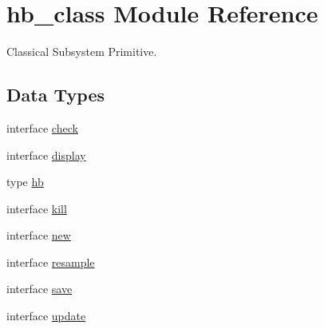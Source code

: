 \hypertarget{classhb__class}{\section{hb\+\_\+class Module Reference}
\label{classhb__class}
}


Classical Subsystem Primitive.  


\subsection*{Data Types}
\begin{DoxyCompactItemize}
\item 
interface \hyperlink{interfacehb__class_1_1check}{check}
\item 
interface \hyperlink{interfacehb__class_1_1display}{display}
\item 
type \hyperlink{structhb__class_1_1hb}{hb}
\item 
interface \hyperlink{interfacehb__class_1_1kill}{kill}
\item 
interface \hyperlink{interfacehb__class_1_1new}{new}
\item 
interface \hyperlink{interfacehb__class_1_1resample}{resample}
\item 
interface \hyperlink{interfacehb__class_1_1save}{save}
\item 
interface \hyperlink{interfacehb__class_1_1update}{update}
\end{DoxyCompactItemize}
